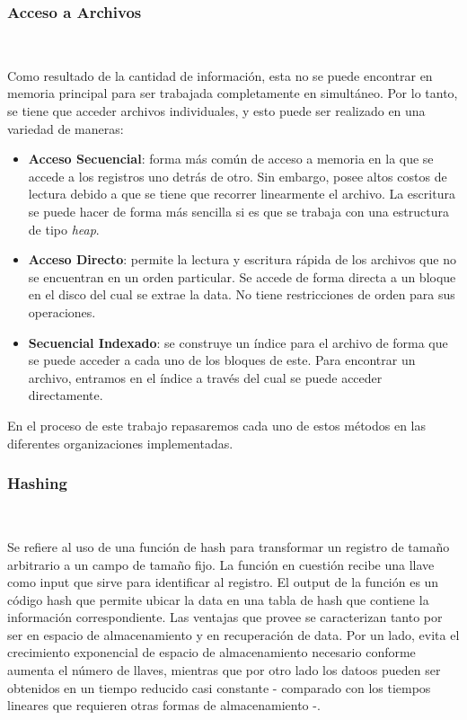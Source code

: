 \documentclass{article}
\begin{document}
      \subsubsection{Acceso a Archivos} 
        
        Como resultado de la cantidad de información, esta no se puede encontrar en memoria principal para ser trabajada completamente en simultáneo. Por lo tanto, se tiene que acceder archivos individuales, y esto puede ser realizado en una variedad de maneras:

        \begin{itemize}
          
         \item \textbf{Acceso Secuencial}: forma más común de acceso a memoria en la que se accede a los registros uno detrás de otro. Sin embargo, posee altos costos de lectura debido a que se tiene que recorrer linearmente el archivo. La escritura se puede hacer de forma más sencilla si es que se trabaja con una estructura de tipo \textit{heap}.
         
         \item \textbf{Acceso Directo}: permite la lectura y escritura rápida de los archivos que no se encuentran en un orden particular. Se accede de forma directa a un bloque en el disco del cual se extrae la data. No tiene restricciones de orden para sus operaciones.
         
         \item \textbf{Secuencial Indexado}: se construye un índice para el archivo de forma que se puede acceder a cada uno de los bloques de este. Para encontrar un archivo, entramos en el índice a través del cual se puede acceder directamente. 

        \end{itemize}

        En el proceso de este trabajo repasaremos cada uno de estos métodos en las diferentes organizaciones implementadas.

      \subsubsection{Hashing} 
        
        Se refiere al uso de una función de hash para transformar un registro de tamaño arbitrario a un campo de tamaño fijo. La función en cuestión recibe una llave como input que sirve para identificar al registro. El output de la función es un código hash que permite ubicar la data en una tabla de hash que contiene la información correspondiente. Las ventajas que provee se caracterizan tanto por ser en espacio de almacenamiento y en recuperación de data. Por un lado, evita el crecimiento exponencial de espacio de almacenamiento necesario conforme aumenta el número de llaves, mientras que por otro lado los datoos pueden ser obtenidos en un tiempo reducido casi constante - comparado con los tiempos lineares que requieren otras formas de almacenamiento -.
\end{document}
